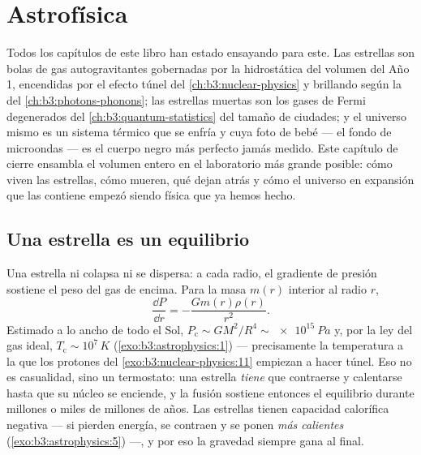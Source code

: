 \chapter{Astrofísica}\label{ch:b3:astrophysics}


Todos los capítulos de este libro han estado ensayando para este. Las estrellas
son bolas de gas autogravitantes gobernadas por la hidrostática del volumen del
Año 1, encendidas por el efecto túnel del \cref{ch:b3:nuclear-physics} y brillando
según la  del \cref{ch:b3:photons-phonons}; las estrellas muertas son
los gases de Fermi degenerados del \cref{ch:b3:quantum-statistics} del tamaño de
ciudades; y el universo mismo es un sistema térmico que se enfría y cuya
foto de bebé --- el fondo de microondas --- es el cuerpo negro más perfecto
jamás medido. Este capítulo de cierre ensambla el volumen entero
en el laboratorio más grande posible: cómo viven las estrellas, cómo
mueren, qué dejan atrás y cómo el universo en expansión
que las contiene empezó siendo física que ya hemos hecho.

\section{Una estrella es un equilibrio}

\begin{proposition}\label{prop:b3:astrophysics:hydrostatic}
Una estrella ni colapsa ni se dispersa: a cada radio, el
gradiente de presión sostiene el peso del gas de encima. Para la
masa $m(r)$ interior al radio $r$,
\[
\frac{\dd P}{\dd r} = -\frac{Gm(r)\rho(r)}{r^2} .
\]
Estimado a lo ancho de todo el Sol, $P_{\text{c}} \sim GM^2/R^4 \sim
\qty{e15}{Pa}$ y, por la ley del gas ideal, $T_{\text{c}} \sim
10^7\,\unit{K}$ (\cref{exo:b3:astrophysics:1}) --- precisamente la
temperatura a la que los protones del \cref{exo:b3:nuclear-physics:11}
empiezan a hacer túnel. Eso no es casualidad, sino un termostato: una estrella
\emph{tiene} que contraerse y calentarse hasta que su núcleo se enciende, y la fusión
sostiene entonces el equilibrio durante millones o miles de millones de años. Las estrellas
tienen capacidad calorífica negativa --- si pierden energía, se contraen y se ponen
\emph{más calientes} (\cref{exo:b3:astrophysics:5}) ---, y por eso
la gravedad siempre gana al final.
\end{proposition}

